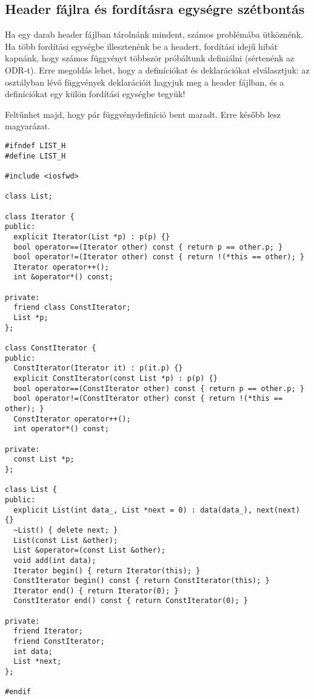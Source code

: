 \documentclass[../cpp_book/cpp_book.tex]{subfiles}
\begin{document}
	\subsection{Header fájlra és fordításra egységre szétbontás}
	Ha egy darab header fájlban tárolnánk mindent, számos problémába ütköznénk. Ha több fordítási egységbe illesztenénk be a headert, fordítási idejű hibát kapnánk, hogy számos függvényt többször próbáltunk definiálni (sértenénk az ODR-t). Erre megoldás lehet, hogy a definíciókat és deklarációkat elválasztjuk: az osztályban lévő függvények deklarációit hagyjuk meg a header fájlban, és a definíciókat egy külön fordítási egységbe tegyük!
	
	\begin{note}
		Feltűnhet majd, hogy pár függvénydefiníció bent maradt. Erre később lesz magyarázat.
	\end{note}
	
	\medskip
\begin{lstlisting}
#ifndef LIST_H
#define LIST_H

#include <iosfwd>

class List;

class Iterator {
public:
  explicit Iterator(List *p) : p(p) {}
  bool operator==(Iterator other) const { return p == other.p; }
  bool operator!=(Iterator other) const { return !(*this == other); }
  Iterator operator++();
  int &operator*() const;

private:
  friend class ConstIterator;
  List *p;
};

class ConstIterator {
public:
  ConstIterator(Iterator it) : p(it.p) {}
  explicit ConstIterator(const List *p) : p(p) {}
  bool operator==(ConstIterator other) const { return p == other.p; }
  bool operator!=(ConstIterator other) const { return !(*this == other); }
  ConstIterator operator++();
  int operator*() const;

private:
  const List *p;
};

class List {
public:
  explicit List(int data_, List *next = 0) : data(data_), next(next) {}
  ~List() { delete next; }
  List(const List &other);
  List &operator=(const List &other);
  void add(int data);
  Iterator begin() { return Iterator(this); }
  ConstIterator begin() const { return ConstIterator(this); }
  Iterator end() { return Iterator(0); }
  ConstIterator end() const { return ConstIterator(0); }

private:
  friend Iterator;
  friend ConstIterator;
  int data;
  List *next;
};

#endif
\end{lstlisting}
\end{document}
